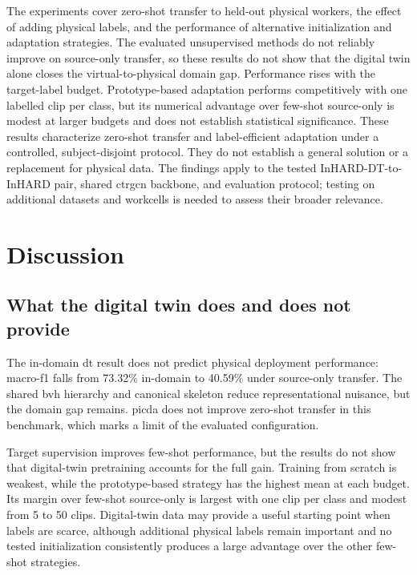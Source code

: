 \documentclass[3p,times,procedia]{elsarticle}
\begin{document}
The experiments cover zero-shot transfer to held-out physical workers, the
effect of adding physical labels, and the performance of alternative
initialization and adaptation strategies. The evaluated unsupervised methods
do not reliably improve on source-only transfer, so these results do not show
that the digital twin alone closes the virtual-to-physical domain gap.
Performance rises with the target-label budget. Prototype-based adaptation
performs competitively with one labelled clip per class, but its numerical
advantage over few-shot source-only is modest at larger budgets and does not
establish statistical significance. These results characterize zero-shot
transfer and label-efficient adaptation under a controlled, subject-disjoint
protocol. They do not establish a general solution or a replacement for
physical data. The findings apply to the tested InHARD-DT-to-InHARD pair,
shared \acs{ctrgcn} backbone, and evaluation protocol; testing on additional
datasets and workcells is needed to assess their broader relevance.

\section{Discussion}
\label{sec:discussion}

\subsection{What the digital twin does and does not provide}

The in-domain \acs{dt} result does not predict physical deployment performance:
macro-\acs{f1} falls from 73.32\% in-domain to 40.59\% under source-only
transfer. The shared \acs{bvh} hierarchy and canonical skeleton reduce
representational nuisance, but the domain gap remains. \acs{picda} does not
improve zero-shot transfer in this benchmark, which marks a limit of the
evaluated configuration.

Target supervision improves few-shot performance, but the results do not show
that digital-twin pretraining accounts for the full gain. Training from
scratch is weakest, while the prototype-based strategy has the highest mean at
each budget. Its margin over few-shot source-only is largest with one clip per
class and modest from 5 to 50 clips. Digital-twin data may provide a
useful starting point when labels are scarce, although additional physical
labels remain important and no tested initialization consistently produces a
large advantage over the other few-shot strategies.
\end{document}
